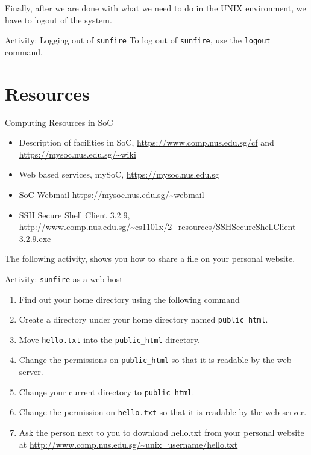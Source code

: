 Finally, after we are done with what we need to do in the UNIX environment, we
have to logout of the system.  

\begin{frame}{Activity: Logging out of \texttt{sunfire}}
To log out of \texttt{sunfire}, use the \texttt{logout} command, 
\end{frame}

\section{Resources}

\begin{frame}{Computing Resources in SoC}
\begin{itemize}
\item Description of facilities in SoC, \url{https://www.comp.nus.edu.sg/cf} and \url{https://mysoc.nus.edu.sg/~wiki}
\item Web based services, mySoC, \url{https://mysoc.nus.edu.sg}
\item SoC Webmail \url{https://mysoc.nus.edu.sg/~webmail}
\item SSH Secure Shell Client 3.2.9, \url{http://www.comp.nus.edu.sg/~cs1101x/2_resources/SSHSecureShellClient-3.2.9.exe}
\end{itemize}
\end{frame}




The following activity, shows you how to share a file on your personal website.  

\begin{frame}[allowframebreaks=0.6]{Activity: \texttt{sunfire} as a web host}
\begin{enumerate}
\item Find out your home directory using the following command
\item Create a directory under your home directory named
\texttt{public\_html}. 
\item Move \texttt{hello.txt} into the \texttt{public\_html} directory. 
\item Change the permissions on \texttt{public\_html} so that it is readable by
the web server. 
\item Change your current directory to \texttt{public\_html}. 
\item Change the permission on \texttt{hello.txt} so that it is readable by the
web server.  
\item Ask the person next to you to download hello.txt from your personal
website at \url{http://www.comp.nus.edu.sg/~unix_username/hello.txt}
\end{enumerate}
\end{frame}

